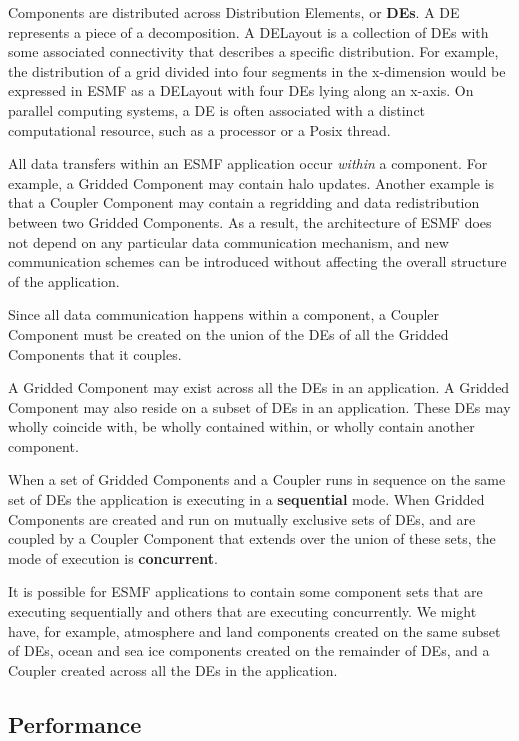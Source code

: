Components are distributed across Distribution Elements, or {\bf DEs}.
A DE represents a piece of a decomposition.  A DELayout is a collection
of DEs with some associated connectivity that describes a specific 
distribution.  For example, the distribution of a grid divided 
into four segments in the x-dimension would be expressed in ESMF as
a DELayout with four DEs lying along an x-axis. On parallel computing
systems, a DE is often associated with a distinct computational resource, 
such as a processor or a Posix thread.  

All data transfers within an ESMF application occur {\it within} a 
component.  For example, a Gridded Component may contain halo updates.
Another example is that a Coupler Component may contain a regridding 
and data redistribution between two Gridded Components.  As a result, 
the architecture of ESMF does not depend on any particular data 
communication mechanism, and new communication schemes can be 
introduced without affecting the overall structure of the application.

Since all data communication happens within a component, a Coupler 
Component must be created on the union of the DEs of all
the Gridded Components that it couples.  

A Gridded Component may exist across all the DEs in an application.  
A Gridded Component may also reside on a subset of DEs in an 
application.  These DEs may wholly coincide with, be wholly contained 
within, or wholly contain another component.  

When a set of Gridded  Components and a Coupler runs in sequence 
on the same set of DEs the application is executing in a {\bf sequential} 
mode. When Gridded Components are created and run on mutually exclusive
sets of DEs, and are coupled by a Coupler Component that extends over
the union of these sets, the mode of execution is {\bf concurrent}.

It is possible for ESMF applications to contain some component sets
that are executing sequentially and others that are executing concurrently.
We might have, for example, atmosphere and land components created 
on the same subset of DEs, ocean and sea ice components created on 
the remainder of DEs, and a Coupler created across all the DEs in
the application.

\subsection{Performance}
\label{sec:performance}

